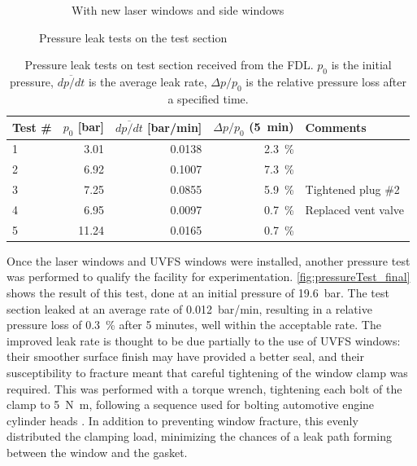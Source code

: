 \begin{figure}[h]
\begin{subfigure}[t]{0.47\textwidth}
                    \caption{With new laser windows and side windows}
                    \label{fig:pressureTest_final}
                \end{subfigure}
                \caption{Pressure leak tests on the test section}
                \label{fig:pressureTest}
            \end{figure}

            \begin{table}[h]
                \centering
                \caption[Pressure leak tests on test section]{Pressure leak tests on test section received from the FDL. $p_0$ is the initial pressure, $\overline{dp/dt}$ is the average leak rate, $\Delta p/p_0$ is the relative pressure loss after a specified time.}
                \label{tab:pressureTests_og}
                \begin{tabular}{lrrrl}
                    \toprule
                    \textbf{Test \#}  & \textbf{$p_0$ [bar]}  & \textbf{$\overline{dp/dt}$ [bar/min]}   & \textbf{$\Delta p/p_0$ (5~min)} & \textbf{Comments} \\
                    \midrule
                    1   & 3.01  & 0.0138    & 2.3~\%    &   \\
                    2   & 6.92  & 0.1007    & 7.3~\%    &   \\
                    3   & 7.25  & 0.0855    & 5.9~\%    & Tightened plug \#2  \\
                    4   & 6.95  & 0.0097    & 0.7~\%    & Replaced vent valve  \\
                    5   & 11.24 & 0.0165    & 0.7~\%    &   \\
                    \bottomrule
                \end{tabular}
            \end{table}

            Once the laser windows and UVFS windows were installed, another pressure test was performed to qualify the facility for experimentation. \autoref{fig:pressureTest_final} shows the result of this test, done at an initial pressure of \qty{19.6}{bar}. The test section leaked at an average rate of \qty{0.012}{bar/min}, resulting in a relative pressure loss of 0.3~\% after 5 minutes, well within the acceptable rate. The improved leak rate is thought to be due partially to the use of UVFS windows: their smoother surface finish may have provided a better seal, and their susceptibility to fracture meant that careful tightening of the window clamp was required. This was performed with a torque wrench, tightening each bolt of the clamp to \qty{5}{N.m}, following a sequence used for bolting automotive engine cylinder heads
            . In addition to preventing window fracture, this evenly distributed the clamping load, minimizing the chances of a leak path forming between the window and the gasket.

